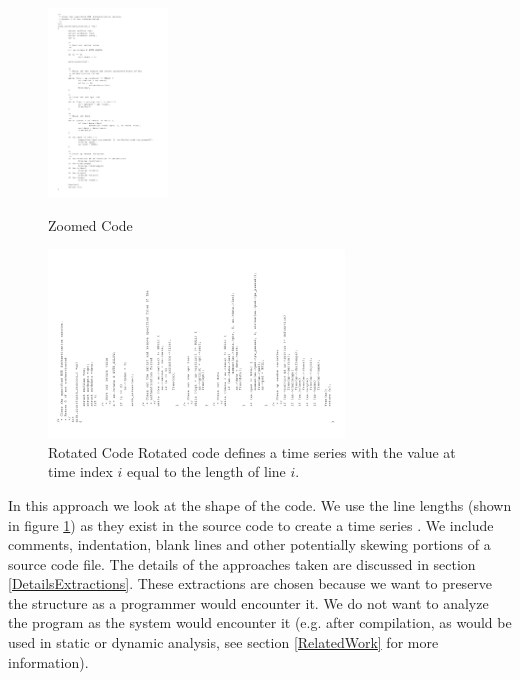 \documentclass[12pt]{article}
\begin{document}
\begin{figure}[h]
\centering
\begin{minipage}[b]{0.40\linewidth}
\includegraphics[width=1.0\linewidth, height=5cm]{source-code-img.png}

\caption{Zoomed Code}
\label{fig:zoomed}
\end{minipage}
\quad
\begin{minipage}[b]{0.55\linewidth}
\includegraphics[width=1.0\linewidth, height=5cm]{source-code-img-sideways.png}

\caption{Rotated Code
\newline
Rotated code defines a time series with the value at time index $i$ equal to the length of line $i$.
}
\label{fig:rotated}
\end{minipage}
\end{figure}


In this approach we look at the shape of the code.   We use the line lengths (shown in figure \ref{fig:rotated})  as they exist in the source code to create a time series .  We include comments, indentation, blank lines and other potentially skewing portions of a source code file.  The details of the approaches taken are discussed in section \ref{DetailsExtractions}.  These extractions are chosen because we want to preserve the structure as a programmer would encounter it.  We do not want to analyze the program as the system would encounter it (e.g. after compilation, as would be used in static or dynamic analysis, see section \ref{RelatedWork} for more information).  
\end{document}

